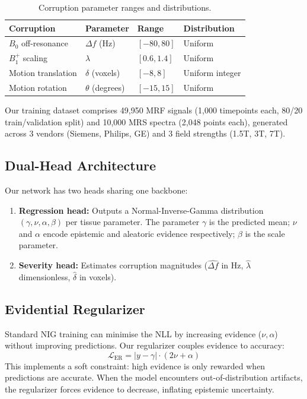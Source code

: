 \documentclass[11pt,a4paper]{article}
\begin{document}
\begin{table}[H]
  \centering
  \caption{Corruption parameter ranges and distributions.}
  \label{tab:corruption_params}
  \begin{tabular}{@{}llll@{}}
    \toprule
    \textbf{Corruption} & \textbf{Parameter} & \textbf{Range} & \textbf{Distribution} \\
    \midrule
    $B_0$ off-resonance & $\Delta f$ (Hz) & $[-80, 80]$ & Uniform \\
    $B_1^+$ scaling & $\lambda$ & $[0.6, 1.4]$ & Uniform \\
    Motion translation & $\delta$ (voxels) & $[-8, 8]$ & Uniform integer \\
    Motion rotation & $\theta$ (degrees) & $[-15, 15]$ & Uniform \\
    \bottomrule
  \end{tabular}
\end{table}

Our training dataset comprises 49,950 MRF signals (1,000 timepoints each, 80/20 train/validation split) and 10,000 MRS spectra (2,048 points each), generated across 3 vendors (Siemens, Philips, GE) and 3 field strengths (1.5T, 3T, 7T).

\subsection{Dual-Head Architecture}

Our network has two heads sharing one backbone:
\begin{enumerate}
  \item \textbf{Regression head:} Outputs a Normal-Inverse-Gamma distribution $(\gamma, \nu, \alpha, \beta)$ per tissue parameter. The parameter $\gamma$ is the predicted mean; $\nu$ and $\alpha$ encode epistemic and aleatoric evidence respectively; $\beta$ is the scale parameter.
  \item \textbf{Severity head:} Estimates corruption magnitudes ($\hat{\Delta f}$ in Hz, $\hat{\lambda}$ dimensionless, $\hat{\delta}$ in voxels).
\end{enumerate}

\subsection{Evidential Regularizer}

Standard NIG training can minimise the NLL by increasing evidence ($\nu, \alpha$) without improving predictions. Our regularizer couples evidence to accuracy:
\begin{equation}
  \mathcal{L}_{\text{ER}} = |y - \gamma| \cdot (2\nu + \alpha)
\end{equation}
This implements a soft constraint: high evidence is only rewarded when predictions are accurate. When the model encounters out-of-distribution artifacts, the regularizer forces evidence to decrease, inflating epistemic uncertainty.
\end{document}
